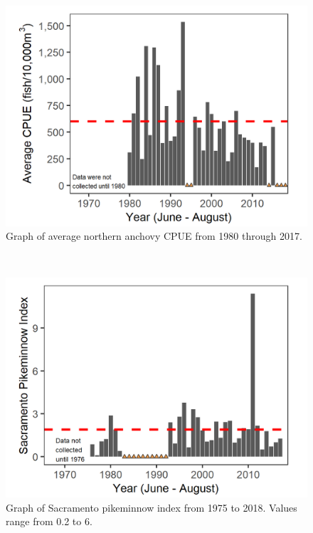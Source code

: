 \documentclass[
]{book}
\begin{document}
\begin{panel-grid}
\begin{columns-nocenter}
\begin{column800}
\begin{expand}
\begin{figure}
\includegraphics[width=15.25in]{figures/noranc_all_years} \caption{Graph of average northern anchovy CPUE from 1980 through 2017.}\label{fig:unnamed-chunk-80}
\end{figure}

\end{expand}

\end{column800}

\begin{column40}

~

\end{column40}

\begin{column800}

\begin{expand}

\begin{figure}
\includegraphics[width=15.25in]{figures/DJFMP_sacpikeminnow_summer} \caption{Graph of Sacramento pikeminnow index from 1975 to 2018. Values range from 0.2 to 6.}\label{fig:unnamed-chunk-81}
\end{figure}


\end{expand}
\end{column800}
\end{columns-nocenter}
\end{panel-grid}
\end{document}
